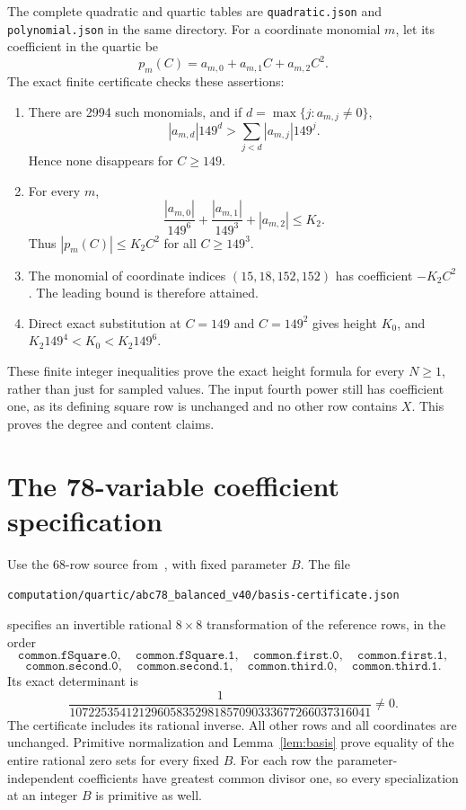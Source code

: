\documentclass[11pt,a4paper]{article}
\begin{document}
The complete quadratic and quartic tables are \texttt{quadratic.json}
and \texttt{polynomial.json} in the same directory. For a coordinate
monomial $m$, let its coefficient in the quartic be
\[
                         p_m(C)=a_{m,0}+a_{m,1}C+a_{m,2}C^2.
\]
The exact finite certificate checks these assertions:
\begin{enumerate}
\item There are 2994 such monomials, and if $d=\max\{j:a_{m,j}\ne0\}$,
\[
             |a_{m,d}|149^d>\sum_{j<d}|a_{m,j}|149^j.
\]
Hence none disappears for $C\ge149$.
\item For every $m$,
\[
 \frac{|a_{m,0}|}{149^6}+\frac{|a_{m,1}|}{149^3}+|a_{m,2}|\le K_2.
\]
Thus $|p_m(C)|\le K_2C^2$ for all $C\ge149^3$.
\item The monomial of coordinate indices $(15,18,152,152)$ has coefficient
$-K_2C^2$. The leading bound is therefore attained.
\item Direct exact substitution at $C=149$ and $C=149^2$ gives height
$K_0$, and $K_2 149^4<K_0<K_2 149^6$.
\end{enumerate}
These finite integer inequalities prove the exact height formula for
every $N\ge1$, rather than just for sampled values. The input fourth
power still has coefficient one, as its defining square row is unchanged
and no other row contains $X$. This proves the degree and content claims.

\section{The 78-variable coefficient specification}
Use the 68-row source from~\cite{Paired}, with fixed parameter $B$.
The file
\begin{center}\small
\nolinkurl{computation/quartic/abc78_balanced_v40/basis-certificate.json}
\end{center}
specifies an invertible rational $8\times8$ transformation of the
reference rows, in the order
\[
 \texttt{common.fSquare.0},\quad\texttt{common.fSquare.1},
 \quad\texttt{common.first.0},\quad\texttt{common.first.1},
\]
\[
 \texttt{common.second.0},\quad\texttt{common.second.1},
 \quad\texttt{common.third.0},\quad\texttt{common.third.1}.
\]
Its exact determinant is
\[
               \frac1{107225354121296058352981857090333677266037316041}\ne0.
\]
The certificate includes its rational inverse. All other rows and all
coordinates are unchanged. Primitive normalization and
Lemma~\ref{lem:basis} prove equality of the entire rational zero sets
for every fixed $B$.
For each row the parameter-independent coefficients have greatest
common divisor one, so every specialization at an integer $B$ is
primitive as well.
\end{document}
